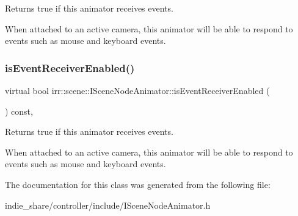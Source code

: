 Returns true if this animator receives events. 

When attached to an active camera, this animator will be able to respond to events such as mouse and keyboard events. \mbox{\label{classirr_1_1scene_1_1ISceneNodeAnimator_a37b22b8767dc6adca575223f02458740}} 
\subsubsection{\texorpdfstring{is\+Event\+Receiver\+Enabled()}{isEventReceiverEnabled()}\hspace{0.1cm}{\footnotesize\ttfamily [2/2]}}
{\footnotesize\ttfamily virtual bool irr\+::scene\+::\+I\+Scene\+Node\+Animator\+::is\+Event\+Receiver\+Enabled (\begin{DoxyParamCaption}{ }\end{DoxyParamCaption}) const\hspace{0.3cm}{\ttfamily [inline]}, {\ttfamily [virtual]}}



Returns true if this animator receives events. 

When attached to an active camera, this animator will be able to respond to events such as mouse and keyboard events. 

The documentation for this class was generated from the following file\+:\begin{DoxyCompactItemize}
\item 
indie\+\_\+share/controller/include/I\+Scene\+Node\+Animator.\+h\end{DoxyCompactItemize}

